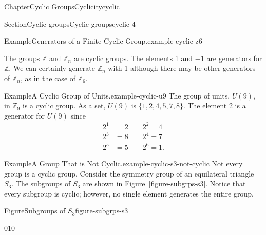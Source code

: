 \documentclass[oneside,10pt,]{book}
\newcommand{\xreffont}{\relax}
\numberwithin{equation}{section}
\begin{document}
\begin{chapterptx}{Chapter}{Cyclic Groups}{}{Cyclicity}{}{}{cyclic}
\begin{sectionptx}{Section}{Cyclic groups}{}{Cyclic groups}{}{}{cyclic-4}
\begin{example}{Example}{Generators of a Finite Cyclic Group.}{example-cyclic-z6}
\end{example}
The groups \({\mathbb Z}\) and \({\mathbb Z}_n\) are cyclic groups. The elements 1 and \(-1\) are generators for \({\mathbb Z}\).  We can certainly generate \({\mathbb Z}_n\) with 1 although there may be other generators of \({\mathbb Z}_n\), as in the case of \({\mathbb Z}_6\).%
\begin{example}{Example}{A Cyclic Group of Units.}{example-cyclic-u9}%
The group of units, \(U(9)\), in \({\mathbb Z}_9\) is a cyclic group.  As a set, \(U(9)\) is \(\{ 1, 2, 4, 5, 7, 8  \}\). The element 2 is a generator for \(U(9)\) since%
\begin{align*}
2^1 & = 2 \qquad 2^2 = 4\\
2^3 & = 8 \qquad 2^4 = 7\\
2^5 & =  5 \qquad 2^6 = 1\text{.}
\end{align*}
%
\end{example}
\begin{example}{Example}{A Group That is Not Cyclic.}{example-cyclic-s3-not-cyclic}%
Not every group is a cyclic group.  Consider the symmetry group of an equilateral triangle \(S_3\).  The subgroups of \(S_3\) are shown in \hyperref[figure-subgrps-s3]{Figure~{\xreffont\ref{figure-subgrps-s3}}}.  Notice that every subgroup is cyclic; however, no single element generates the entire group.%
\end{example}
\begin{figureptx}{Figure}{Subgroups of \(S_3\)}{figure-subgrps-s3}{}%
\begin{image}{0}{1}{0}{}%
\end{image}
\end{figureptx}
\end{sectionptx}
\end{chapterptx}
\end{document}
